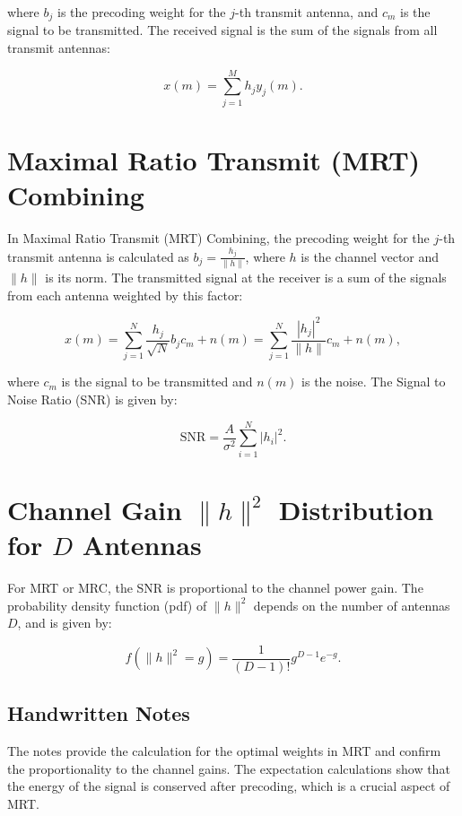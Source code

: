 where \( b_j \) is the precoding weight for the \( j \)-th transmit antenna, and \( c_m \) is the signal to be transmitted. The received signal is the sum of the signals from all transmit antennas:

\begin{equation}
x(m) = \sum_{j=1}^{M} h_j y_j(m).
\end{equation}





\section*{Maximal Ratio Transmit (MRT) Combining}

In Maximal Ratio Transmit (MRT) Combining, the precoding weight for the \(j\)-th transmit antenna is calculated as \( b_j = \frac{h_j}{\|h\|} \), where \( h \) is the channel vector and \( \|h\| \) is its norm. The transmitted signal at the receiver is a sum of the signals from each antenna weighted by this factor:

\begin{equation}
x(m) = \sum_{j=1}^{N} \frac{h_j}{\sqrt{N}} b_j c_m + n(m) = \sum_{j=1}^{N} \frac{|h_j|^2}{\|h\|} c_m + n(m),
\end{equation}

where \( c_m \) is the signal to be transmitted and \( n(m) \) is the noise. The Signal to Noise Ratio (SNR) is given by:

\begin{equation}
\text{SNR} = \frac{A}{\sigma^2} \sum_{i=1}^{N} |h_i|^2.
\end{equation}

\section*{Channel Gain \( \|h\|^2 \) Distribution for \( D \) Antennas}

For MRT or MRC, the SNR is proportional to the channel power gain. The probability density function (pdf) of \( \|h\|^2 \) depends on the number of antennas \( D \), and is given by:

\begin{equation}
f(\|h\|^2 = g) = \frac{1}{(D-1)!} g^{D-1} e^{-g}.
\end{equation}

\subsection*{Handwritten Notes}
The notes provide the calculation for the optimal weights in MRT and confirm the proportionality to the channel gains. The expectation calculations show that the energy of the signal is conserved after precoding, which is a crucial aspect of MRT. 

